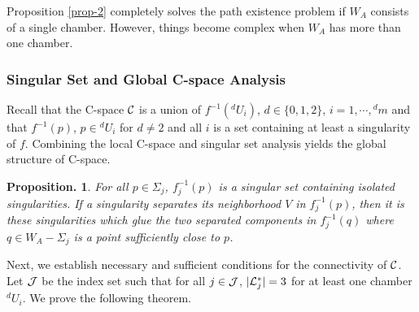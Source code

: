 \documentclass[twocolumn]{IEEEtran}
\newtheorem{Proposition}{{\bf Proposition.}}
\newcommand{\reals}{{\Bbb R}}
\begin{document}
\medskip

Proposition \ref{prop-2} completely solves the path existence
problem if $W_A$ consists of a single chamber. However, things
become complex when $W_A$ has more than one chamber.

\subsubsection{Singular Set and Global C-space Analysis}

Recall that the C-space ${\cal C}$ is a union of
$f^{-1}({}^d\!U_i)$, $d \in \{0,1,2\}$, $i=1,\cdots,{}^d\!m$ and
that $f^{-1}(p)$, $p\in {}^d\!U_i$ for $d\neq 2$ and all $i$ is a
set containing at least a singularity of $f$.
Combining the local C-space and singular set analysis
yields the global structure of C-space.

\medskip

\begin{Proposition}
\label{prop-sing} \rm For all $p \in \Sigma_j$, $f_j^{-1}(p)$ is a
singular set containing isolated singularities. If a singularity
separates its neighborhood $V$ in $f_j^{-1}(p)$, then it is these
singularities which glue the two separated components in
$f_j^{-1}(q)$ where $q \in W_A-\Sigma_j$ is a point sufficiently
close to $p$.
\end{Proposition}

\medskip


Next, we establish necessary and sufficient conditions for the
connectivity of ${\cal C}$.  Let ${\cal J}$ be the index set such
that for all $j \in {\cal J}$, $|{\cal L}_j^*|=3$ for at least one
chamber ${}^d\!U_i$. We prove the following theorem.
\end{document}
